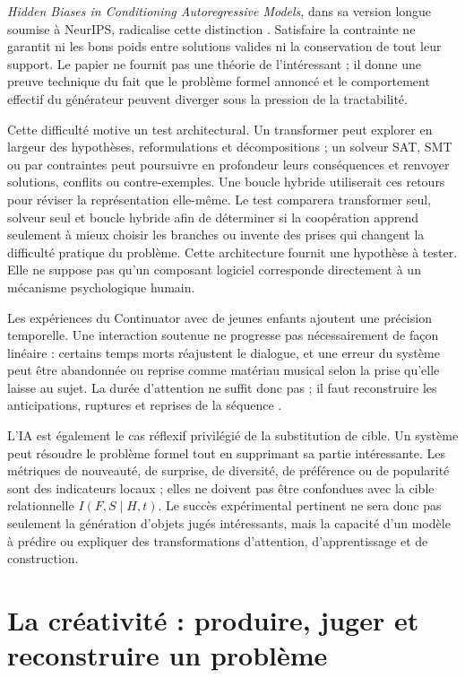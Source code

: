 \documentclass[11pt,a4paper]{article}
\begin{document}
\emph{Hidden Biases in Conditioning Autoregressive Models}, dans sa version
longue soumise à NeurIPS, radicalise cette distinction
\parencite{pachet2026biases}. Satisfaire la contrainte ne garantit ni les bons
poids entre solutions valides ni la conservation de tout leur support. Le papier
ne fournit pas une théorie de l'intéressant ; il donne une preuve technique du
fait que le problème formel annoncé et le comportement effectif du générateur
peuvent diverger sous la pression de la tractabilité.

Cette difficulté motive un test architectural. Un transformer peut explorer en
largeur des hypothèses, reformulations et décompositions ; un solveur SAT, SMT ou
par contraintes peut poursuivre en profondeur leurs conséquences et renvoyer
solutions, conflits ou contre-exemples. Une boucle hybride utiliserait ces
retours pour réviser la représentation elle-même. Le test comparera transformer
seul, solveur seul et boucle hybride afin de déterminer si la coopération apprend
seulement à mieux choisir les branches ou invente des prises qui changent la
difficulté pratique du problème. Cette architecture fournit une hypothèse à
tester. Elle ne suppose pas qu'un composant logiciel corresponde directement à
un mécanisme psychologique humain.

Les expériences du Continuator avec de jeunes enfants ajoutent une précision
temporelle. Une interaction soutenue ne progresse pas nécessairement de façon
linéaire : certains temps morts réajustent le dialogue, et une erreur du système
peut être abandonnée ou reprise comme matériau musical selon la prise qu'elle
laisse au sujet. La durée d'attention ne suffit donc pas ; il faut reconstruire
les anticipations, ruptures et reprises de la séquence
\parencite{addessi2005experiments,addessi2006flowmachine}.

L'IA est également le cas réflexif privilégié de la substitution de cible. Un
système peut résoudre le problème formel tout en supprimant sa
partie intéressante. Les métriques de nouveauté, de surprise, de diversité, de
préférence ou de popularité sont des indicateurs locaux ; elles ne
doivent pas être confondues avec la cible relationnelle
\(I(F,S\mid H,t)\). Le succès expérimental pertinent ne sera donc pas seulement
la génération d'objets jugés intéressants, mais la capacité d'un modèle à
prédire ou expliquer des transformations d'attention, d'apprentissage et de
construction.

\section{La créativité : produire, juger et reconstruire un problème}
\end{document}
